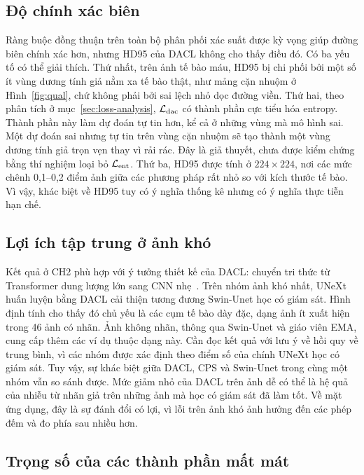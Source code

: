 \subsection{Độ chính xác biên}

Ràng buộc đồng thuận trên toàn bộ phân phối xác suất được kỳ vọng giúp đường biên chính xác hơn, nhưng HD95 của DACL không cho thấy điều đó. Có ba yếu tố có thể giải thích. Thứ nhất, trên ảnh tế bào máu, HD95 bị chi phối bởi một số ít vùng dương tính giả nằm xa tế bào thật, như mảng cặn nhuộm ở Hình~\ref{fig:qual}, chứ không phải bởi sai lệch nhỏ dọc đường viền. Thứ hai, theo phân tích ở mục~\ref{sec:loss-analysis}, $\mathcal{L}_{\mathrm{dac}}$ có thành phần cực tiểu hóa entropy. Thành phần này làm dự đoán tự tin hơn, kể cả ở những vùng mà mô hình sai. Một dự đoán sai nhưng tự tin trên vùng cặn nhuộm sẽ tạo thành một vùng dương tính giả trọn vẹn thay vì rải rác. Đây là giả thuyết, chưa được kiểm chứng bằng thí nghiệm loại bỏ $\mathcal{L}_{\mathrm{ent}}$. Thứ ba, HD95 được tính ở $224\times224$, nơi các mức chênh 0,1--0,2 điểm ảnh giữa các phương pháp rất nhỏ so với kích thước tế bào. Vì vậy, khác biệt về HD95 tuy có ý nghĩa thống kê nhưng có ý nghĩa thực tiễn hạn chế.

\subsection{Lợi ích tập trung ở ảnh khó}

Kết quả ở CH2 phù hợp với ý tưởng thiết kế của DACL: chuyển tri thức từ Transformer dung lượng lớn sang CNN nhẹ~\cite{wang2026dacl}. Trên nhóm ảnh khó nhất, UNeXt huấn luyện bằng DACL cải thiện tương đương Swin-Unet học có giám sát. Hình định tính cho thấy đó chủ yếu là các cụm tế bào dày đặc, dạng ảnh ít xuất hiện trong 46 ảnh có nhãn. Ảnh không nhãn, thông qua Swin-Unet và giáo viên EMA, cung cấp thêm các ví dụ thuộc dạng này. Cần đọc kết quả với lưu ý về hồi quy về trung bình, vì các nhóm được xác định theo điểm số của chính UNeXt học có giám sát. Tuy vậy, sự khác biệt giữa DACL, CPS và Swin-Unet trong cùng một nhóm vẫn so sánh được. Mức giảm nhỏ của DACL trên ảnh dễ có thể là hệ quả của nhiễu từ nhãn giả trên những ảnh mà học có giám sát đã làm tốt. Về mặt ứng dụng, đây là sự đánh đổi có lợi, vì lỗi trên ảnh khó ảnh hưởng đến các phép đếm và đo phía sau nhiều hơn.

\subsection{Trọng số của các thành phần mất mát}


